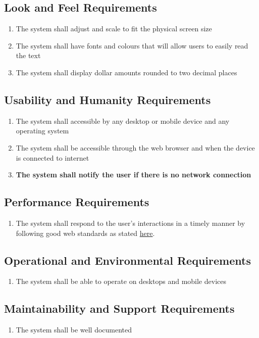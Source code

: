 \documentclass[12pt]{article}
\begin{document}
\subsection{Look and Feel Requirements}
\begin{enumerate}[LF\arabic*.]
	\item The system shall adjust and scale to fit the physical screen size
	\item The system shall have fonts and colours that will allow users to easily read the text
	\item The system shall display dollar amounts rounded to two decimal places
\end{enumerate}

\subsection{Usability and Humanity Requirements}
\begin{enumerate}[UH\arabic*.]
	\item The system shall accessible by any desktop or mobile device and any operating system
	\item The system shall be accessible through the web browser and when the device is connected to internet
	\item \textbf{The system shall notify the user if there is no network connection}
\end{enumerate}

\subsection{Performance Requirements}
\begin{enumerate}[PR\arabic*.]
	\item The system shall respond to the user's interactions in a timely manner by following good web
	      standards as stated \href{https://web.dev/vitals/}{here}.
\end{enumerate}

\subsection{Operational and Environmental Requirements}
\begin{enumerate}[OE\arabic*.]
	\item The system shall be able to operate on desktops and mobile devices
\end{enumerate}

\subsection{Maintainability and Support Requirements}
\begin{enumerate}[MS\arabic*.]
	\item The system shall be well documented
\end{enumerate}
\end{document}
